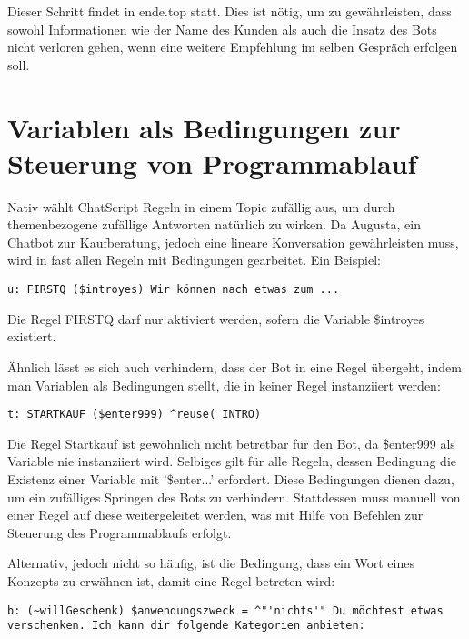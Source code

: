 Dieser Schritt findet in ende.top statt. Dies ist nötig, um zu gewährleisten, dass sowohl Informationen wie der Name des Kunden als auch die Insatz des Bots nicht verloren gehen, wenn eine weitere Empfehlung im selben Gespräch erfolgen soll. 


\section{Variablen als Bedingungen zur Steuerung von Programmablauf}
\label{sec:ChatScript: Variablen als Bedingungen zur Steuerung von Programmablauf}

Nativ wählt ChatScript Regeln in einem Topic zufällig aus, um durch themenbezogene zufällige Antworten natürlich zu wirken. Da Augusta, ein Chatbot zur Kaufberatung, jedoch eine lineare Konversation gewährleisten muss, wird in fast allen Regeln mit Bedingungen gearbeitet. Ein Beispiel: 

\begin{lstlisting}[caption={Regelkopf von FIRSTQ in kaufabsicht.top}]
u: FIRSTQ ($introyes) Wir können nach etwas zum ... 
\end{lstlisting}

Die Regel FIRSTQ darf nur aktiviert werden, sofern die Variable \$introyes existiert. 

Ähnlich lässt es sich auch verhindern, dass der Bot in eine Regel übergeht, indem man Variablen als Bedingungen stellt, die in keiner Regel instanziiert werden:

\begin{lstlisting}[caption={Regelkopf von STARTKAUF in kaufabsicht.top}]
t: STARTKAUF ($enter999) ^reuse( INTRO)
\end{lstlisting}

Die Regel Startkauf ist gewöhnlich nicht betretbar für den Bot, da \$enter999 als Variable nie instanziiert wird. Selbiges gilt für alle Regeln, dessen Bedingung die Existenz einer Variable mit '\$enter...' erfordert. Diese Bedingungen dienen dazu, um ein zufälliges Springen des Bots zu verhindern. \textcolor[rgb]{1,0.41,0.13}{Stattdessen} muss manuell von einer Regel auf diese weitergeleitet werden, was mit Hilfe von Befehlen zur Steuerung des Programmablaufs erfolgt. 

Alternativ, jedoch nicht so häufig, ist die Bedingung, dass ein Wort eines Konzepts zu erwähnen ist, damit eine Regel betreten wird:

\begin{lstlisting}[caption={Regelkopf einer Regel in kaufabsicht.top}]
b: (~willGeschenk) $anwendungszweck = ^"'nichts'" Du möchtest etwas verschenken. Ich kann dir folgende Kategorien anbieten:
\end{lstlisting}

